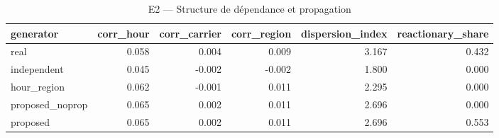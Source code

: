\begin{table}
\caption{E2 — Structure de dépendance et propagation}
\label{tab:T2}
\begin{tabular}{lrrrrr}
\toprule
generator & corr\_hour & corr\_carrier & corr\_region & dispersion\_index & reactionary\_share \\
\midrule
real & 0.058 & 0.004 & 0.009 & 3.167 & 0.432 \\
independent & 0.045 & -0.002 & -0.002 & 1.800 & 0.000 \\
hour\_region & 0.062 & -0.001 & 0.011 & 2.295 & 0.000 \\
proposed\_noprop & 0.065 & 0.002 & 0.011 & 2.696 & 0.000 \\
proposed & 0.065 & 0.002 & 0.011 & 2.696 & 0.553 \\
\bottomrule
\end{tabular}
\end{table}

